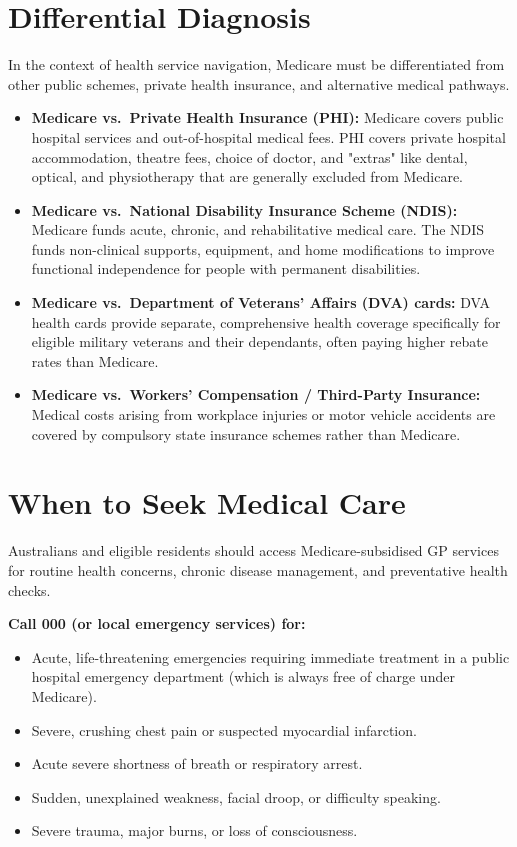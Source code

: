 \section*{Differential Diagnosis}
In the context of health service navigation, Medicare must be differentiated from other public schemes, private health insurance, and alternative medical pathways.
\begin{itemize}
    \item \textbf{Medicare vs.\ Private Health Insurance (PHI):} Medicare covers public hospital services and out-of-hospital medical fees. PHI covers private hospital accommodation, theatre fees, choice of doctor, and "extras" like dental, optical, and physiotherapy that are generally excluded from Medicare.
    \item \textbf{Medicare vs.\ National Disability Insurance Scheme (NDIS):} Medicare funds acute, chronic, and rehabilitative medical care. The NDIS funds non-clinical supports, equipment, and home modifications to improve functional independence for people with permanent disabilities.
    \item \textbf{Medicare vs.\ Department of Veterans' Affairs (DVA) cards:} DVA health cards provide separate, comprehensive health coverage specifically for eligible military veterans and their dependants, often paying higher rebate rates than Medicare.
    \item \textbf{Medicare vs.\ Workers' Compensation / Third-Party Insurance:} Medical costs arising from workplace injuries or motor vehicle accidents are covered by compulsory state insurance schemes rather than Medicare.
\end{itemize}

\section*{When to Seek Medical Care}
Australians and eligible residents should access Medicare-subsidised GP services for routine health concerns, chronic disease management, and preventative health checks.

\textbf{Call 000 (or local emergency services) for:}
\begin{itemize}
    \item Acute, life-threatening emergencies requiring immediate treatment in a public hospital emergency department (which is always free of charge under Medicare).
    \item Severe, crushing chest pain or suspected myocardial infarction.
    \item Acute severe shortness of breath or respiratory arrest.
    \item Sudden, unexplained weakness, facial droop, or difficulty speaking.
    \item Severe trauma, major burns, or loss of consciousness.
\end{itemize}

